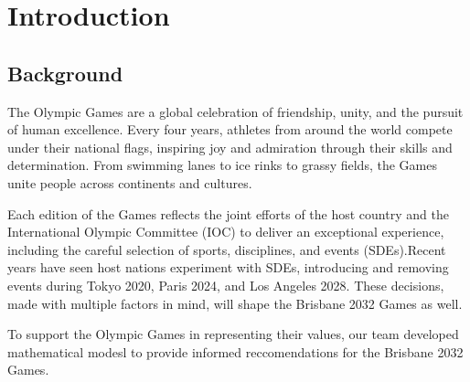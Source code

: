 \documentclass[12pt]{article}
\begin{document}
\tableofcontents


\section{Introduction}

\subsection{Background}

The Olympic Games are a global celebration of friendship, unity, and the pursuit of human excellence. Every four years, athletes from around the world compete under their national flags, inspiring joy and admiration through their skills and determination. From swimming lanes to ice rinks to grassy fields, the Games unite people across continents and cultures.

Each edition of the Games reflects the joint efforts of the host country and the International Olympic Committee (IOC) to deliver an exceptional experience, including the careful selection of sports, disciplines, and events (SDEs).Recent years have seen host nations experiment with SDEs, introducing and removing events during Tokyo 2020, Paris 2024, and Los Angeles 2028. These decisions, made with multiple factors in mind, will shape the Brisbane 2032 Games as well.

To support the Olympic Games in representing their values, our team developed mathematical modesl to provide informed reccomendations for the Brisbane 2032 Games.

\end{document}
